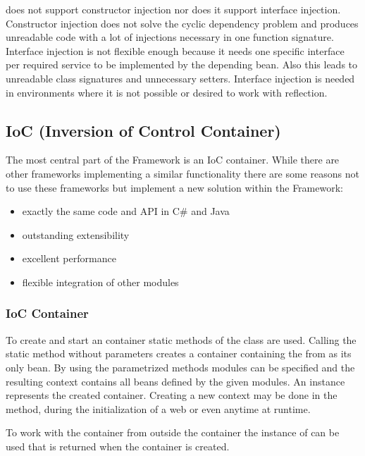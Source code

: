 \AMBETH{} does not support constructor injection nor does it support interface injection. Constructor injection does not solve the cyclic dependency problem and produces unreadable code with a lot of injections necessary in one function signature. Interface injection is not flexible enough because it needs one specific interface per required service to be implemented by the depending bean. Also this leads to unreadable class signatures and unnecessary setters. Interface injection is needed in environments where it is not possible or desired to work with reflection.

\subsection{IoC (Inversion of Control Container)}
The most central part of the \AMBETH{} Framework is an IoC container. While there are other frameworks implementing a similar functionality there are some reasons not to use these frameworks but implement a new solution within the \AMBETH{} Framework:

\begin{itemize}
	\item exactly the same code and API in C\# and Java
	\item outstanding extensibility
	\item excellent performance
	\item flexible integration of other \AMBETH{} modules
\end{itemize}

\subsubsection{IoC Container}
To create and start an \AMBETH{} container static methods of the class  are used. Calling the static method  without parameters creates a container containing the  from \AMBETH{} as its only bean. By using the parametrized methods modules can be specified and the resulting context contains all beans defined by the given modules. An instance  represents the created container.
Creating a new context may be done in the  method, during the initialization of a web  or even anytime at runtime.

To work with the container from outside the container the instance of  can be used that is returned when the container is created.

